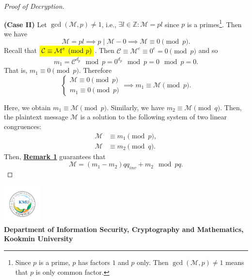 \documentclass{article}
\newcommand{\mathcolorbox}[2]{\colorbox{#1}{$\displaystyle #2$}}
\newcommand{\footer}[1]{
\begin{flushright}
	\vspace{2em}
	\includegraphics[width=2cm]{school_logo.jpg} \\
	\vspace{1em}
	\textcolor{blue2}{\small\textbf{#1}}
\end{flushright}
}
\newcommand{\ie}{\textnormal{i.e.}}
\theoremstyle{definition}
\newcommand{\Z}{\mathbb{Z}}
\newcommand{\of}[1]{\left( #1 \right)}
\begin{document}
\begin{proof}[Proof of Decryption]
\begin{itemize}
\begin{tcolorbox}[colback=white,colframe=black,arc=5pt,title={\color{white}\bf }]
			\textbf{(Case II)} Let $\gcd\of{\mathcal{M},p}\neq 1$, \ie, $\exists l\in\Z:\mathcal{M}=pl$ since $p$ is a primes\footnote{Since $p$ is a prime, $p$ has factors $1$ and $p$ only. Then $\gcd\of{\mathcal{M},p}\neq 1$ means that $p$ is only common factor.}. Then we have \[
			\mathcal{M}=pl\implies p\mid\mathcal{M}-0\implies\mathcal{M}\equiv 0\pmod{p}.
			\] Recall that {$\mathcolorbox{-blue}{\mathcal{C}\equiv\mathcal{M}^e\pmod{p}}$}. Then $\mathcal{C}\equiv\mathcal{M}^e\equiv 0^e=0\pmod{p}$ and so\[
			m_1=\mathcal{C}^{d_p}\mod p=0^{d_p}\mod p= 0\mod p=0.
			\] That is, $m_1\equiv 0\pmod{p}$. Therefore \[
			\begin{cases}
				\mathcal{M}\equiv 0\pmod{p}\\
				m_1\equiv 0\pmod{p}
			\end{cases}\implies m_1\equiv\mathcal{M}\pmod{p}.
			\] 
		\end{tcolorbox}
	\end{itemize} 
	Here, we obtain $m_1\equiv\mathcal{M}\pmod{p}$. Similarly, we have $m_2\equiv\mathcal{M}\pmod{q}$. Then, the plaintext message $\mathcal{M}$ is a solution to the following system of two linear congruences: \begin{align*}
		\mathcal{M}&\equiv m_1\pmod{p},\\
		\mathcal{M}&\equiv m_2\pmod{q}.
	\end{align*}
	Then, \hyperlink{rmk1}{\textbf{Remark 1}} guarantees that \[
	\mathcal{M}=(m_1-m_2)qq_{inv}+m_2\mod pq.
	\]
\end{proof}

\footer{Department of Information Security, Cryptography and Mathematics, Kookmin University}
\end{document}
